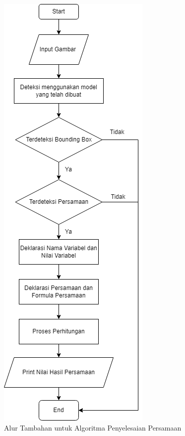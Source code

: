 \begin{figure}[H]
    \centering
    \includegraphics[scale=0.7]{gambar/model_perhitungan.png}
    \caption{Alur Tambahan untuk Algoritma Penyelesaian Persamaan}
    \label{fig:aluralgoritmaperhitungan}
\end{figure}
\par
